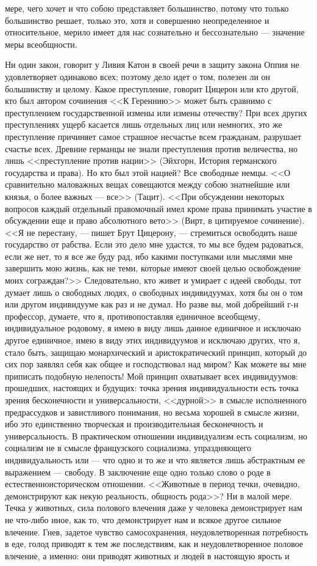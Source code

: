 \documentclass[12pt]{article}
\begin{document}
мере, чего хочет и что собою представляет большинство, потому что только большинство решает, только это, хотя и совершенно неопределенное и относительное, мерило имеет для нас сознательно и бессознательно --- значение меры всеобщности. 

Ни один закон, говорит у Ливия Катон в своей речи в защиту закона Оппия не удовлетворяет одинаково всех; поэтому дело идет о том, полезен ли он большинству и целому. Какое преступление, говорит Цицерон или кто другой, кто был автором сочинения <<К Гереннию>>  может быть сравнимо с преступлением государственной измены или измены отечеству? При всех других преступлениях ущерб касается лишь отдельных лиц или немногих, это же преступление причиняет самое страшное несчастье всем гражданам, разрушает счастье всех. Древние германцы не знали преступления против величества, но лишь <<преступление против нации>> (Эйхгорн, История германского государства и права). Но кто был этой нацией? Все свободные немцы. <<О сравнительно маловажных вещах совещаются между собою знатнейшие или князья, о более важных --- все>> (Тацит). <<При обсуждении некоторых вопросов каждый отдельный правомочный имел кроме права принимать участие в обсуждении еще и право абсолютного вето>> (Вирт, в цитируемое сочинение). <<Я не перестану, --- пишет Брут Цицерону, --- стремиться освободить наше государство от рабства. Если это дело мне удастся, то мы все будем радоваться, если же нет, то я все же буду рад, ибо какими поступками или мыслями мне завершить мою жизнь, как не теми, которые имеют своей целью освобождение моих сограждан?>> Следовательно, кто живет и умирает с идеей свободы, тот думает лишь о свободных людях, о свободных индивидуумах, хотя бы он о том или другом индивидууме как раз и не думал. Но разве вы, мой добрейший г-н профессор, думаете, что я, противопоставляя единичное всеобщему, индивидуальное родовому, я имею в виду лишь данное единичное и исключаю другое единичное, имею в виду этих индивидуумов и исключаю других, что я, стало быть, защищаю монархический и аристократический принцип, который до сих пор заявлял себя как общее и господствовал над миром? Как можете вы мне приписать подобную нелепость! Мой принцип охватывает всех индивидуумов: прошедших, настоящих и будущих: точка зрения индивидуальности есть точка зрения бесконечности и универсальности, <<дурной>> в смысле исполненного предрассудков и завистливого понимания, но весьма хорошей в смысле жизни, ибо это единственно творческая и производительная бесконечность и универсальность. В практическом отношении индивидуализм есть социализм, но социализм не в смысле французского социализма, упраздняющего индивидуальность или --- что одно и то же и что является лишь абстрактным ее выражением --- свободу. В заключение еще одно только слово о роде в естественноисторическом отношении. <<Животные в период течки, очевидно, демонстрируют как некую реальность, общность рода>>? Ни в малой мере. Течка у животных, сила полового влечения даже у человека демонстрирует нам не что-либо иное, как то, что демонстрирует нам и всякое другое сильное влечение. Гнев, задетое чувство самосохранения, неудовлетворенная потребность в еде, голод приводят к тем же последствиям, как и неудовлетворенное половое влечение, а именно: они приводят животных и людей в настоящую ярость и 
\end{document}
